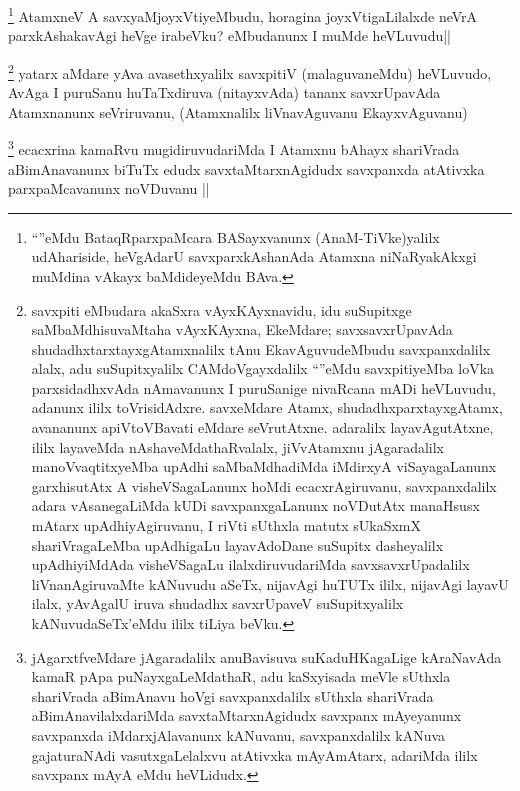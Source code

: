 
\begin{artha}
\footnote{``\stext''eMdu BataqRparxpaMcara BASayxvanunx (AnaM-TiVke)yalilx udAhariside, heVgAdarU savxparxkAshanAda Atamxna niNaRyakAkxgi muMdina vAkayx baMdideyeMdu BAva.}
AtamxneV A savxyaMjoyxVtiyeMbudu, horagina joyxVtigaLilalxde neVrA parxkAshakavAgi heVge irabeVku? eMbudanunx I muMde heVLuvudu||
\end{artha}


\begin{artha}
\footnote{savxpiti eMbudara akaSxra vAyxKAyxnavidu, idu suSupitxge saMbaMdhisuvaMtaha vAyxKAyxna, EkeMdare; savxsavxrUpavAda shudadhxtarxtayxgAtamxnalilx tAnu EkavAguvudeMbudu savxpanxdalilx alalx, adu suSupitxyalilx CAMdoVgayxdalilx ``\stext''eMdu savxpitiyeMba loVka parxsidadhxvAda nAmavanunx I puruSanige nivaRcana mADi heVLuvudu, adanunx ililx toVrisidAdxre. savxeMdare Atamx, shudadhxparxtayxgAtamx, avananunx apiVtoVBavati eMdare seVrutAtxne. adaralilx layavAgutAtxne, ililx layaveMda nAshaveMdathaRvalalx, jiVvAtamxnu jAgaradalilx manoVvaqtitxyeMba upAdhi saMbaMdhadiMda iMdirxyA viSayagaLanunx garxhisutAtx A visheVSagaLanunx hoMdi ecacxrAgiruvanu, savxpanxdalilx adara vAsanegaLiMda kUDi savxpanxgaLanunx noVDutAtx manaHsusx mAtarx upAdhiyAgiruvanu, I riVti sUthxla matutx sUkaSxmX shariVragaLeMba upAdhigaLu layavAdoDane suSupitx dasheyalilx upAdhiyiMdAda visheVSagaLu ilalxdiruvudariMda savxsavxrUpadalilx liVnanAgiruvaMte kANuvudu aSeTx, nijavAgi huTUTx ililx, nijavAgi layavU ilalx, yAvAgalU iruva shudadhx savxrUpaveV suSupitxyalilx kANuvudaSeTx'eMdu ililx tiLiya beVku.}
yatarx aMdare yAva avasethxyalilx savxpitiV (malaguvaneMdu) heVLuvudo, AvAga I puruSanu huTaTxdiruva (nitayxvAda) tananx savxrUpavAda Atamxnanunx seVriruvanu, (Atamxnalilx liVnavAguvanu EkayxvAguvanu)
\end{artha}


\begin{artha}
\footnote{jAgarxtfveMdare jAgaradalilx anuBavisuva suKaduHKagaLige kAraNavAda kamaR pApa puNayxgaLeMdathaR, adu kaSxyisada meVle sUthxla shariVrada aBimAnavu hoVgi savxpanxdalilx sUthxla shariVrada aBimAnavilalxdariMda savxtaMtarxnAgidudx savxpanx mAyeyanunx savxpanxda iMdarxjAlavanunx kANuvanu, savxpanxdalilx kANuva gajaturaNAdi vasutxgaLelalxvu atAtivxka mAyAmAtarx, adariMda ililx savxpanx mAyA eMdu heVLidudx.}
ecacxrina kamaRvu mugidiruvudariMda I Atamxnu bAhayx shariVrada aBimAnavanunx biTuTx edudx savxtaMtarxnAgidudx savxpanxda atAtivxka parxpaMcavanunx noVDuvanu ||
\end{artha}


